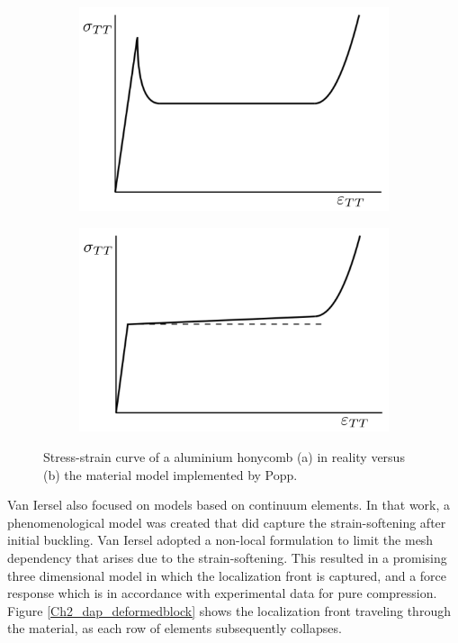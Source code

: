 \begin{figure}[H]
    \centering
    \begin{subfigure}[b]{0.48\linewidth}
        \includegraphics[width=0.7\linewidth]{./Images/Ch2/Ch2_dap_popp_dap.png}
        \caption{}
        \label{Ch2_poppdap1}
    \end{subfigure}
    \begin{subfigure}[b]{0.48\linewidth}
        \includegraphics[width=0.7\linewidth]{./Images/Ch2/Ch2_dap_popp_popp.png}
         \caption{}
          \label{Ch2_poppdap2}
    \end{subfigure}
    \caption{Stress-strain curve of a aluminium honycomb (a) in reality versus (b) the material model implemented by Popp.\cite{DAP}}
    \label{Ch2_poppdap}
\end{figure}
Van Iersel \cite{DAP} also focused on models based on continuum elements. In that work, a phenomenological model was created that did capture the strain-softening after initial buckling. Van Iersel adopted a non-local formulation to limit the mesh dependency that arises due to the strain-softening. This resulted in a promising three dimensional model in which the localization front is captured, and a force response which is in accordance with experimental data for pure compression. Figure \ref{Ch2_dap_deformedblock} shows the localization front traveling through the material, as each row of elements subsequently collapses.
